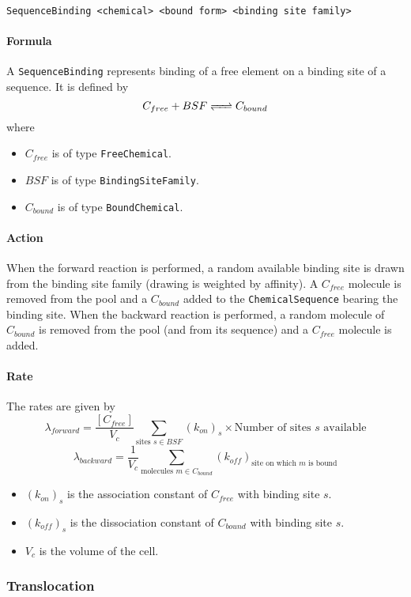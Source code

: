 \begin{verbatim}
SequenceBinding <chemical> <bound form> <binding site family>
\end{verbatim}

\paragraph{Formula} A \texttt{SequenceBinding} represents binding of a free element on a binding site of a sequence. It is defined by
$$
	\reactionRev{C_{free} + BSF}{C_{bound}}{}{}
$$
where
\begin{itemize}
	\item $C_{free}$ is of type \texttt{FreeChemical}.
	\item $BSF$ is of type \texttt{BindingSiteFamily}.
	\item $C_{bound}$ is of type \texttt{BoundChemical}.
\end{itemize}

\paragraph{Action} When the forward reaction is performed, a random available binding site is drawn from the binding site family (drawing is weighted by affinity). A $C_{free}$ molecule is removed from the pool and a $C_{bound}$ added to the \texttt{ChemicalSequence} bearing the binding site. When the backward reaction is performed, a random molecule of $C_{bound}$ is removed from the pool (and from its sequence) and a $C_{free}$ molecule is added.

\paragraph{Rate} The rates are given by
$$
	\lambda_{forward} = \frac{[C_{free}]}{V_c} \sum_{\text{sites }s \in BSF} (k_{on})_s \times \text{Number of sites $s$ available}
$$ 
$$
	\lambda_{backward} = \frac{1}{V_c} \sum_{\text{molecules }m \in C_{bound}} (k_{off})_\text{site on which $m$ is bound}
$$
\begin{itemize}
	\item $(k_{on})_s$ is the association constant of $C_{free}$ with binding site $s$.
	\item $(k_{off})_s$ is the dissociation constant of $C_{bound}$ with binding site $s$.
	\item $V_c$ is the volume of the cell.
\end{itemize}

\subsubsection{Translocation}

